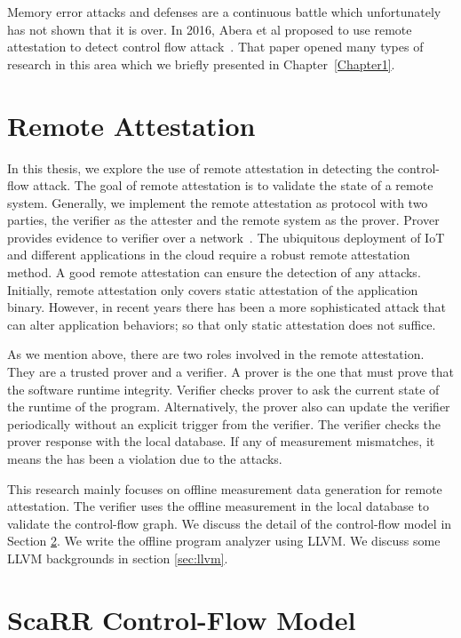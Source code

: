 Memory error attacks and defenses are a continuous battle which unfortunately
has not shown that it is over. In 2016, Abera et al proposed to use remote
attestation to detect control flow
attack~\cite{aberaCFLATControlFlowAttestation2016}. That paper opened many types
of research in this area which we briefly presented in Chapter~\ref{Chapter1}.
 
\section{Remote Attestation}
\label{sec:remote-attestation}

In this thesis, we explore the use of remote attestation in detecting the
control-flow attack. The goal of remote attestation is to validate the state of
a remote system. Generally, we implement the remote attestation as protocol with
two parties, the verifier as the attester and the remote system as the prover.
Prover provides evidence to verifier over a
network~\cite{cokerPrinciplesRemoteAttestation2011a}. The ubiquitous deployment
of IoT and different applications in the cloud require a robust remote
attestation method. A good remote attestation can ensure the detection of any
attacks. Initially, remote attestation only covers static attestation of the
application binary. However, in recent years there has been a more sophisticated
attack that can alter application behaviors; so that only static attestation
does not suffice. 

As we mention above, there are two roles involved in the remote attestation.
They are a trusted prover and a verifier. A prover is the one that must prove
that the software runtime integrity. Verifier checks prover to ask the current
state of the runtime of the program. Alternatively, the prover also can update
the verifier periodically without an explicit trigger from the verifier. The
verifier checks the prover response with the local database. If any of
measurement mismatches, it means the has been a violation due to the attacks.

This research mainly focuses on offline measurement data generation for remote
attestation. The verifier uses the offline measurement in the local database to
validate the control-flow graph.  We discuss the detail of the control-flow
model in Section \ref{sec:scarr-model}. We write the offline program analyzer
using LLVM. We discuss some LLVM backgrounds in section \ref{sec:llvm}.

\section{ScaRR Control-Flow Model} 
\label{sec:scarr-model}

